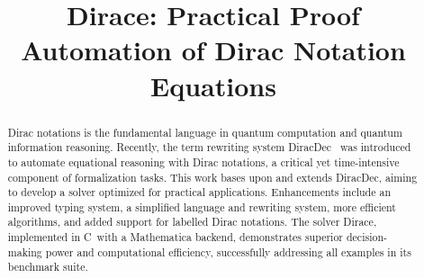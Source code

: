\documentclass[runningheads]{llncs}
\newcommand{\CC}{C\nolinebreak\hspace{-.05em}\raisebox{.4ex}{\tiny\bf +}\nolinebreak\hspace{-.10em}\raisebox{.4ex}{\tiny\bf +}}
\def\CC{{C\nolinebreak[4]\hspace{-.05em}\raisebox{.4ex}{\tiny\bf ++}}}
\begin{document}
%
\title{Dirace: Practical Proof Automation of Dirac Notation Equations}




%
\maketitle              %
%
\begin{abstract}

    Dirac notations is the fundamental language in quantum computation and quantum information reasoning. Recently, the term rewriting system DiracDec~\cite{diracdec} was introduced to automate equational reasoning with Dirac notations, a critical yet time-intensive component of formalization tasks. This work bases upon and extends DiracDec, aiming to develop a solver optimized for practical applications. Enhancements include an improved typing system, a simplified language and rewriting system, more efficient algorithms, and added support for labelled Dirac notations. The solver Dirace, implemented in \CC\ with a Mathematica backend, demonstrates superior decision-making power and computational efficiency, successfully addressing all examples in its benchmark suite.


\end{abstract}
%
%
%



\newcommand*{\sem}[1]{{\llbracket #1 \rrbracket}}
\newcommand{\DiracDec}{\textsf{DiracDec}}
\end{document}
